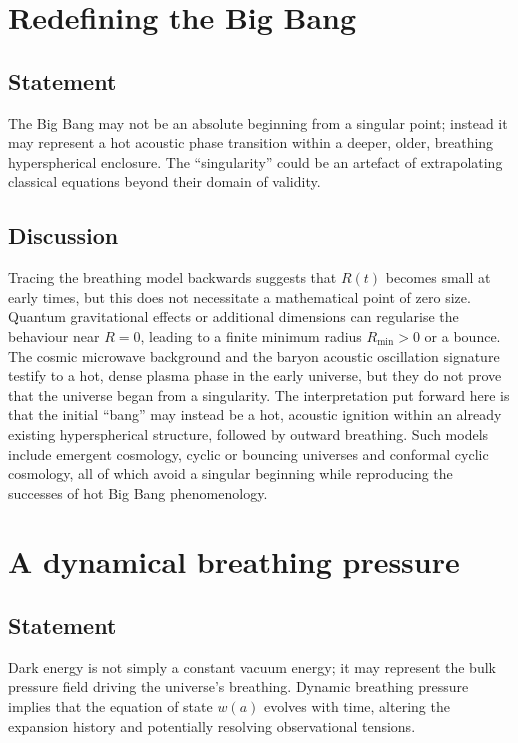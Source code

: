 \documentclass{article}
\begin{document}
\section{Redefining the Big Bang}
\label{sec:bigbang}
\subsection{Statement}
The Big Bang may not be an absolute beginning from a singular point; instead it may represent a hot acoustic phase transition within a deeper, older, breathing hyperspherical enclosure.  The ``singularity'' could be an artefact of extrapolating classical equations beyond their domain of validity.

\subsection{Discussion}
Tracing the breathing model backwards suggests that $R(t)$ becomes small at early times, but this does not necessitate a mathematical point of zero size.  Quantum gravitational effects or additional dimensions can regularise the behaviour near $R=0$, leading to a finite minimum radius $R_{\min} > 0$ or a bounce.  The cosmic microwave background and the baryon acoustic oscillation signature testify to a hot, dense plasma phase in the early universe, but they do not prove that the universe began from a singularity.  The interpretation put forward here is that the initial ``bang'' may instead be a hot, acoustic ignition within an already existing hyperspherical structure, followed by outward breathing.  Such models include emergent cosmology, cyclic or bouncing universes and conformal cyclic cosmology, all of which avoid a singular beginning while reproducing the successes of hot Big Bang phenomenology.

\section{A dynamical breathing pressure}
\label{sec:darkenergy}
\subsection{Statement}
Dark energy is not simply a constant vacuum energy; it may represent the bulk pressure field driving the universe’s breathing.  Dynamic breathing pressure implies that the equation of state $w(a)$ evolves with time, altering the expansion history and potentially resolving observational tensions.
\end{document}
